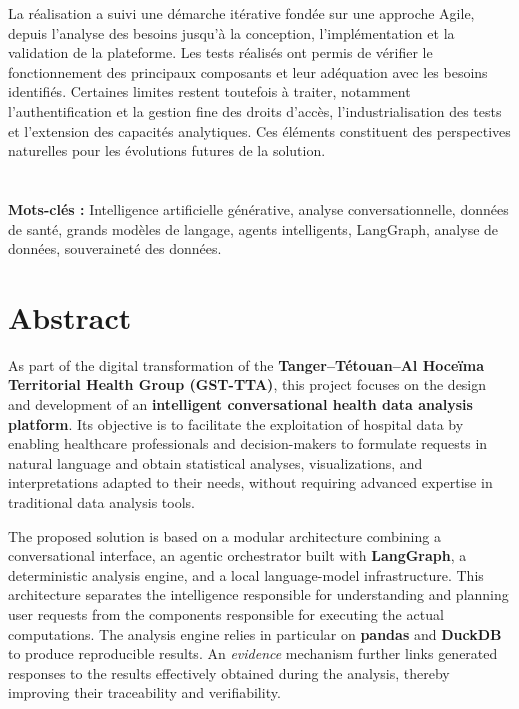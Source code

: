 La réalisation a suivi une démarche itérative fondée sur une approche Agile, depuis l'analyse des besoins jusqu'à la conception, l'implémentation et la validation de la plateforme. Les tests réalisés ont permis de vérifier le fonctionnement des principaux composants et leur adéquation avec les besoins identifiés. Certaines limites restent toutefois à traiter, notamment l'authentification et la gestion fine des droits d'accès, l'industrialisation des tests et l'extension des capacités analytiques. Ces éléments constituent des perspectives naturelles pour les évolutions futures de la solution.
\\
\\ 
\\ 
\textbf{Mots-clés :} Intelligence artificielle générative, analyse conversationnelle, données de santé, grands modèles de langage, agents intelligents, LangGraph, analyse de données, souveraineté des données.















\chapter*{Abstract}

As part of the digital transformation of the \textbf{Tanger--Tétouan--Al Hoceïma Territorial Health Group (GST-TTA)}, this project focuses on the design and development of an \textbf{intelligent conversational health data analysis platform}. Its objective is to facilitate the exploitation of hospital data by enabling healthcare professionals and decision-makers to formulate requests in natural language and obtain statistical analyses, visualizations, and interpretations adapted to their needs, without requiring advanced expertise in traditional data analysis tools.

The proposed solution is based on a modular architecture combining a conversational interface, an agentic orchestrator built with \textbf{LangGraph}, a deterministic analysis engine, and a local language-model infrastructure. This architecture separates the intelligence responsible for understanding and planning user requests from the components responsible for executing the actual computations. The analysis engine relies in particular on \textbf{pandas} and \textbf{DuckDB} to produce reproducible results. An \textit{evidence} mechanism further links generated responses to the results effectively obtained during the analysis, thereby improving their traceability and verifiability.

